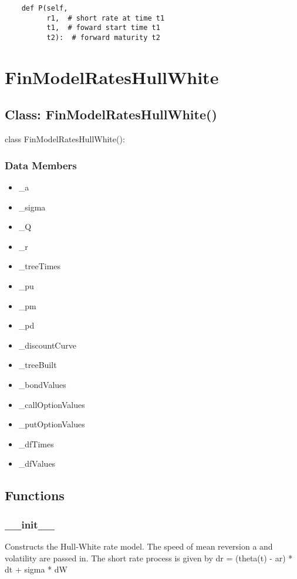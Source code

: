 \documentclass[twoside,11pt]{book}
\begin{document}
\begin{lstlisting}
    def P(self,
          r1,  # short rate at time t1
          t1,  # foward start time t1
          t2):  # forward maturity t2
\end{lstlisting}

\newpage
\section{FinModelRatesHullWhite}

\subsection*{Class: FinModelRatesHullWhite()}
class FinModelRatesHullWhite(): 

\subsubsection*{Data Members}
\begin{itemize}
\item{\_a}
\item{\_sigma}
\item{\_Q}
\item{\_r}
\item{\_treeTimes}
\item{\_pu}
\item{\_pm}
\item{\_pd}
\item{\_discountCurve}
\item{\_treeBuilt}
\item{\_bondValues}
\item{\_callOptionValues}
\item{\_putOptionValues}
\item{\_dfTimes}
\item{\_dfValues}
\end{itemize}

\subsection*{Functions}

\subsubsection*{{\bf \_\_init\_\_}}
Constructs the Hull-White rate model. The speed of mean reversion a and volatility are passed in. The short rate process is given by dr = (theta(t) - ar) * dt  + sigma * dW  
\end{document}
